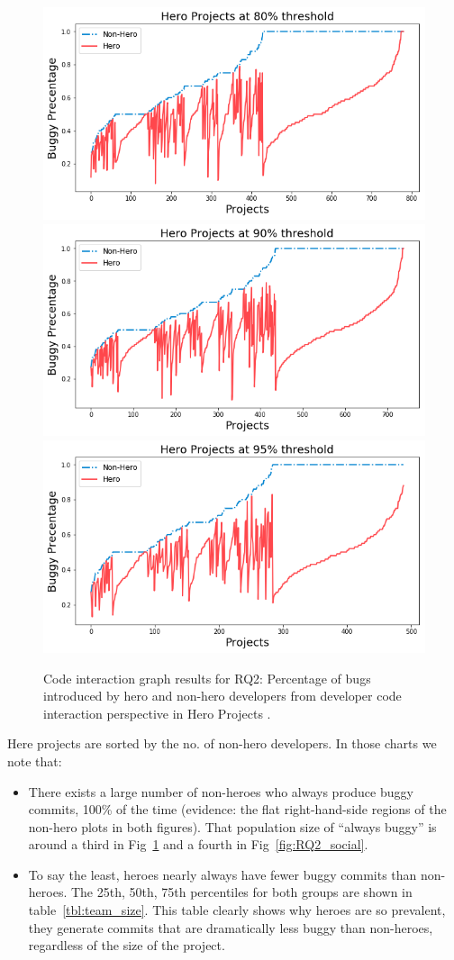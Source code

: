 \documentclass[smallextended]{svjour3}
\newcommand{\bi}{\begin{itemize}}
\newcommand{\ei}{\end{itemize}}
\begin{document}
\begin{figure}[!t]
\begin{center}
\includegraphics[width=.7\linewidth]{80_Code.png}
\includegraphics[width=.7\linewidth]{90_Code.png}
\includegraphics[width=.7\linewidth]{95_Code.png}
\end{center}
\caption{Code interaction  graph results for
RQ2: Percentage of bugs introduced by hero and non-hero developers from developer code interaction perspective in Hero Projects .}
\label{fig:RQ2_code}
\end{figure}

Here projects are sorted by the no. of non-hero developers. In those charts we note that:
\bi
\item
There exists a large number of non-heroes who always produce buggy commits, 100\% of the time (evidence: the flat right-hand-side regions of the non-hero plots in both figures). That population size of ``always buggy'' is around a third in 
Fig~\ref{fig:RQ2_code} and a fourth in Fig~\ref{fig:RQ2_social}.
\item
To say the least, heroes nearly always have fewer buggy commits than non-heroes. The 25th, 50th, 75th percentiles for both groups are
shown in table~\ref{tbl:team_size}. This table clearly shows why heroes are so  prevalent, they generate commits that are dramatically
less buggy than non-heroes, regardless of the size of the project.
\ei
\end{document}
